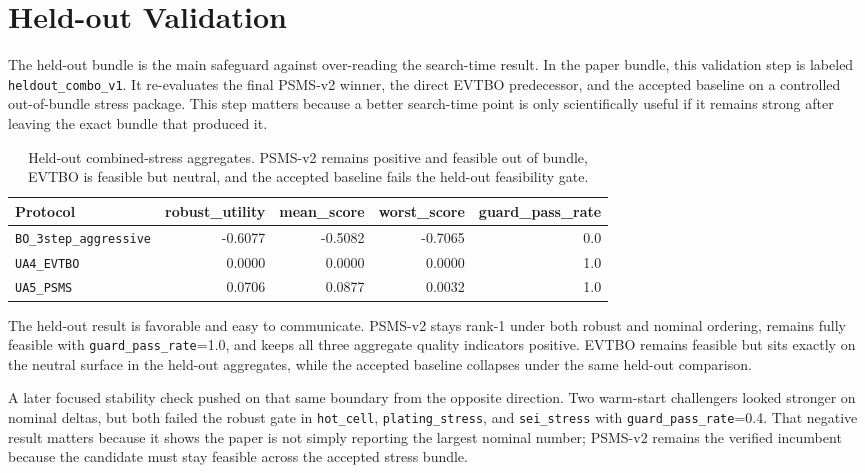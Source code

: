 \documentclass[11pt]{article}
\begin{document}
\section{Held-out Validation}

The held-out bundle is the main safeguard against over-reading the search-time result. In the paper bundle, this validation step is labeled \texttt{heldout\_combo\_v1}. It re-evaluates the final PSMS-v2 winner, the direct EVTBO predecessor, and the accepted baseline on a controlled out-of-bundle stress package. This step matters because a better search-time point is only scientifically useful if it remains strong after leaving the exact bundle that produced it.

\begin{table}[t]
  \centering
  \small
  \begin{tabular}{lrrrr}
    \toprule
    Protocol & robust\_utility & mean\_score & worst\_score & guard\_pass\_rate \\
    \midrule
    \texttt{BO\_3step\_aggressive} & -0.6077 & -0.5082 & -0.7065 & 0.0 \\
    \texttt{UA4\_EVTBO} & 0.0000 & 0.0000 & 0.0000 & 1.0 \\
    \texttt{UA5\_PSMS} & 0.0706 & 0.0877 & 0.0032 & 1.0 \\
    \bottomrule
  \end{tabular}
  \caption{Held-out combined-stress aggregates. PSMS-v2 remains positive and feasible out of bundle, EVTBO is feasible but neutral, and the accepted baseline fails the held-out feasibility gate.}
  \label{tab:heldout}
\end{table}

The held-out result is favorable and easy to communicate. PSMS-v2 stays rank-1 under both robust and nominal ordering, remains fully feasible with \texttt{guard\_pass\_rate}=1.0, and keeps all three aggregate quality indicators positive. EVTBO remains feasible but sits exactly on the neutral surface in the held-out aggregates, while the accepted baseline collapses under the same held-out comparison.

A later focused stability check pushed on that same boundary from the opposite direction. Two warm-start challengers looked stronger on nominal deltas, but both failed the robust gate in \texttt{hot\_cell}, \texttt{plating\_stress}, and \texttt{sei\_stress} with \texttt{guard\_pass\_rate}=0.4. That negative result matters because it shows the paper is not simply reporting the largest nominal number; PSMS-v2 remains the verified incumbent because the candidate must stay feasible across the accepted stress bundle.
\end{document}

